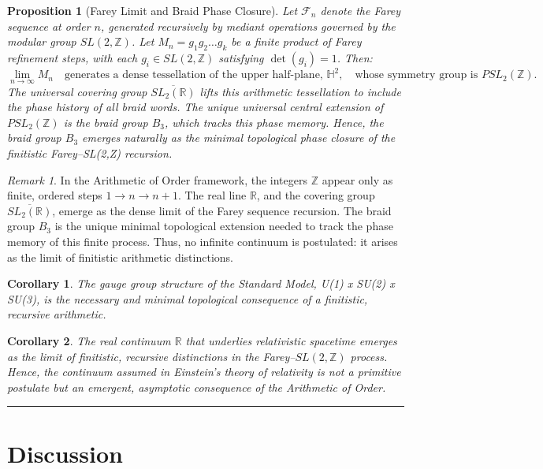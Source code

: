 \documentclass{article}
\newtheorem{proposition}{Proposition}
\newtheorem{corollary}{Corollary}[proposition]
\theoremstyle{remark}
\newtheorem*{remark}{Remark}
\begin{document}
\begin{proposition}[Farey Limit and Braid Phase Closure]
Let $\mathcal{F}_n$ denote the Farey sequence at order $n$, generated recursively by mediant operations governed by the modular group $SL(2,\mathbb{Z})$.
Let $M_n = g_1 g_2 \dots g_k$ be a finite product of Farey refinement steps, with each $g_i \in SL(2,\mathbb{Z})$ satisfying $\det(g_i) = 1$.
Then:
\[
\lim_{n \to \infty} M_n
\quad
\text{generates a dense tessellation of the upper half-plane, }
\mathbb{H}^2,
\quad
\text{whose symmetry group is } PSL_2(\mathbb{Z}).
\]
The universal covering group $\overline{SL_2(\mathbb{R})}$ lifts this arithmetic tessellation to include the phase history of all braid words. The unique universal central extension of $PSL_2(\mathbb{Z})$ is the braid group $B_3$, which tracks this phase memory. Hence, the braid group $B_3$ emerges naturally as the minimal topological phase closure of the finitistic Farey–SL(2,Z) recursion.
\end{proposition}

\begin{remark}
In the Arithmetic of Order framework, the integers $\mathbb{Z}$ appear only as finite, ordered steps $1 \to n \to n+1$. The real line $\mathbb{R}$, and the covering group $\overline{SL_2(\mathbb{R})}$, emerge as the dense limit of the Farey sequence recursion. The braid group $B_3$ is the unique minimal topological extension needed to track the phase memory of this finite process. Thus, no infinite continuum is postulated: it arises as the limit of finitistic arithmetic distinctions.
\end{remark}

\begin{corollary}
The gauge group structure of the Standard Model, U(1) x SU(2) x SU(3), is the necessary and minimal topological consequence of a finitistic, recursive arithmetic.
\end{corollary}

\begin{corollary}
The real continuum $\mathbb{R}$ that underlies relativistic spacetime emerges as the limit of finitistic, recursive distinctions in the Farey–$SL(2,\mathbb{Z})$ process. 
Hence, the continuum assumed in Einstein's theory of relativity is not a primitive postulate but an emergent, asymptotic consequence of the Arithmetic of Order.
\end{corollary}

\hrule
\section{Discussion}
\end{document}
